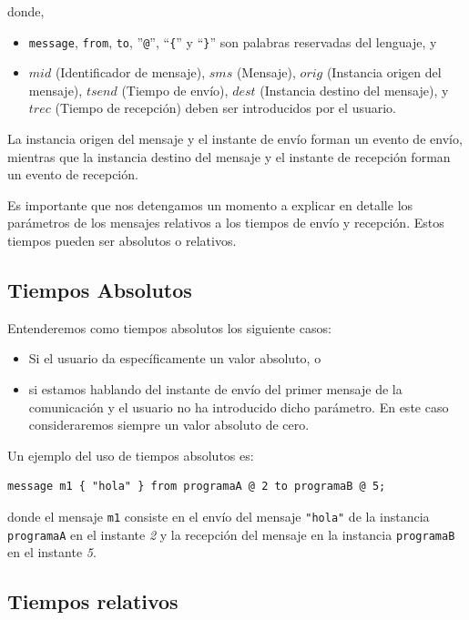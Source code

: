 \documentclass[12pt,a4paper]{report}
\begin{document}
donde,
\begin{itemize}
\item \lstinline{message}, \lstinline{from}, \lstinline{to}, ''\lstinline{@}'', ``\lstinline!{!'' y ``\lstinline!}!'' son palabras reservadas del lenguaje, y
\item $mid$ (Identificador de mensaje), $sms$ (Mensaje), $orig$ (Instancia origen del mensaje), $tsend$ (Tiempo de envío), $dest$ (Instancia destino del mensaje), y $trec$ (Tiempo de recepción) deben ser introducidos por el usuario.
\end{itemize}

La instancia origen del mensaje y el instante de envío forman un evento de envío, mientras que la instancia destino del mensaje y el instante de recepción forman un evento de recepción.

Es importante que nos detengamos un momento a explicar en detalle los parámetros de los mensajes relativos a los tiempos de envío y recepción. Estos tiempos pueden ser absolutos o relativos.

\subsection{Tiempos Absolutos}

Entenderemos como tiempos absolutos los siguiente casos:

\begin{itemize}
\item Si el usuario da específicamente un valor absoluto, o
\item si estamos hablando del instante de envío del primer mensaje de la comunicación y el usuario no ha introducido dicho parámetro. En este caso consideraremos siempre un valor absoluto de cero. 
\end{itemize}

Un ejemplo del uso de tiempos absolutos es:

\begin{lstlisting}
message m1 { "hola" } from programaA @ 2 to programaB @ 5;
\end{lstlisting}

donde el mensaje \lstinline{m1} consiste en el envío del mensaje \lstinline{"hola"} de la instancia \lstinline{programaA} en el instante \textit{2} y la recepción del mensaje en la instancia \lstinline{programaB} en el instante \textit{5}.

\subsection{Tiempos relativos}
\end{document}
